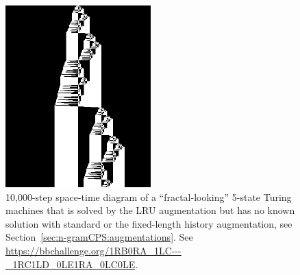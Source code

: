 \begin{figure}
    \centering
    \includegraphics[width=0.5\textwidth]{figures/space-time-diagrams/ngramcps_LRU_35409542.png}

    \caption{10,000-step space-time diagram of a ``fractal-looking'' 5-state Turing machines that is solved by the LRU augmentation but has no known solution with standard \ngramcps or the fixed-length history augmentation, see Section~\ref{sec:n-gramCPS:augmentations}. See \url{https://bbchallenge.org/1RB0RA_1LC---_1RC1LD_0LE1RA_0LC0LE}.}\label{fig:ngram-cps-more}
\end{figure}




\newcommand{\leftngram}{left\xspace}
\newcommand{\rightngram}{right\xspace}
\newcommand{\middlesymbol}{middle\xspace}

